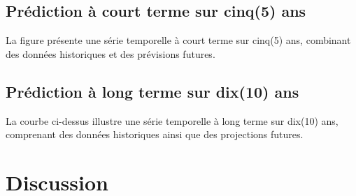 \subsection{Prédiction à court terme sur cinq(5) ans}
La figure présente une série temporelle à court terme sur cinq(5) ans, combinant des données historiques et des prévisions futures.
\subsection{Prédiction à long terme sur dix(10) ans}
La courbe ci-dessus illustre une série temporelle à long terme sur dix(10) ans, comprenant des données historiques ainsi que des projections futures.
\section{Discussion}